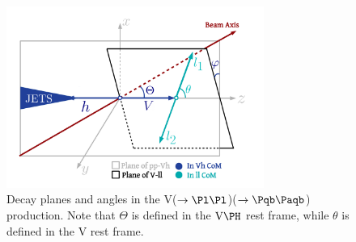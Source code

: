 \documentclass[a4paper,11pt]{article}
\newcommand{\Pb}{{{\Pqb}}\xspace}
\newcommand{\PAb}{{{{\Paqb}}}\xspace}
\renewcommand{\PV}{{{{V}}}\xspace}
\begin{document}
\begin{figure}[hbtp]
\begin{center}
\includegraphics[width=0.75\textwidth]{Figures/LHE/TheThreeAnglesVh.pdf}
\end{center}
\caption{
Decay planes and angles in the \PV($\rightarrow \textrm{\Pl} \textrm{\Pl}$)\PH($\rightarrow \Pb \PAb$) production. Note that $\Theta$ is defined in the $\textrm{\PV}\PH$ rest frame, while $\theta$ is defined in the \PV rest frame.
}
\label{fig:HelicityFrame}
\end{figure}
\end{document}
